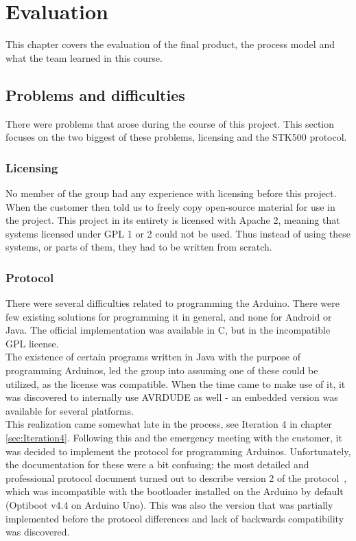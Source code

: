 \chapter{Evaluation}

This chapter covers the evaluation of the final product, the process model and what the team learned in this course.

\section{Problems and difficulties}
	There were problems that arose during the course of this project. This section focuses on the two biggest of these problems, licensing and the STK500 protocol.

	\subsection{Licensing}
	No member of the group had any experience with licensing before this project. When the customer then told us to freely copy open-source material for use in the project. This project in its entirety is licensed with Apache 2, meaning that systems licensed under GPL 1 or 2 could not be used. Thus instead of using these systems, or parts of them, they had to be written from scratch.

	\subsection{Protocol}\label{sec:protocol-issues}
	There were several difficulties related to programming the Arduino. There were few existing solutions for programming it in general, and none for Android or Java. The official implementation was available in C, but in the incompatible GPL license.\\

	The existence of certain programs written in Java with the purpose of programming Arduinos,
	led the group into assuming one of these could be utilized, as the license was compatible. When the time came to make use of it, it was discovered to internally use AVRDUDE as well - an embedded version was available for several platforms.\\

	This realization came somewhat late in the process, see Iteration 4 in chapter \ref{sec:Iteration4}. Following this and the emergency meeting with the customer, it was decided to implement the protocol for programming Arduinos. Unfortunately, the documentation for these were a bit confusing; the most detailed and professional protocol document turned out to describe version 2 of the protocol~\cite{AVR068}, which was incompatible with the bootloader installed on the Arduino by default (Optiboot v4.4 on Arduino Uno). This was also the version that was partially implemented before the protocol differences and lack of backwards compatibility was discovered.\\

